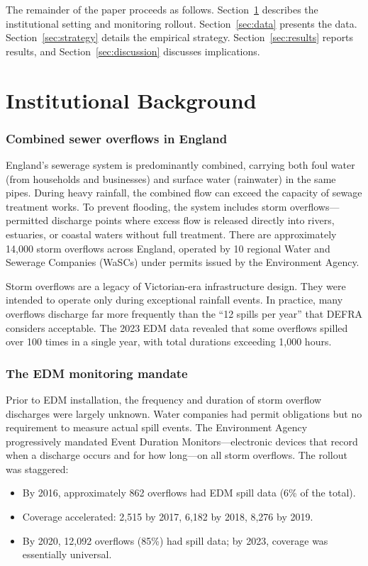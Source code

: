 \documentclass[12pt]{article}
\begin{document}
The remainder of the paper proceeds as follows. Section~\ref{sec:background} describes the institutional setting and monitoring rollout. Section~\ref{sec:data} presents the data. Section~\ref{sec:strategy} details the empirical strategy. Section~\ref{sec:results} reports results, and Section~\ref{sec:discussion} discusses implications.


\section{Institutional Background}
\label{sec:background}

\subsubsection*{Combined sewer overflows in England} England's sewerage system is predominantly combined, carrying both foul water (from households and businesses) and surface water (rainwater) in the same pipes. During heavy rainfall, the combined flow can exceed the capacity of sewage treatment works. To prevent flooding, the system includes storm overflows---permitted discharge points where excess flow is released directly into rivers, estuaries, or coastal waters without full treatment. There are approximately 14,000 storm overflows across England, operated by 10 regional Water and Sewerage Companies (WaSCs) under permits issued by the Environment Agency.

Storm overflows are a legacy of Victorian-era infrastructure design. They were intended to operate only during exceptional rainfall events. In practice, many overflows discharge far more frequently than the ``12 spills per year'' that DEFRA considers acceptable. The 2023 EDM data revealed that some overflows spilled over 100 times in a single year, with total durations exceeding 1,000 hours.

\subsubsection*{The EDM monitoring mandate} Prior to EDM installation, the frequency and duration of storm overflow discharges were largely unknown. Water companies had permit obligations but no requirement to measure actual spill events. The Environment Agency progressively mandated Event Duration Monitors---electronic devices that record when a discharge occurs and for how long---on all storm overflows. The rollout was staggered:

\begin{itemize}
\item By 2016, approximately 862 overflows had EDM spill data (6\% of the total).
\item Coverage accelerated: 2,515 by 2017, 6,182 by 2018, 8,276 by 2019.
\item By 2020, 12,092 overflows (85\%) had spill data; by 2023, coverage was essentially universal.
\end{itemize}
\end{document}
